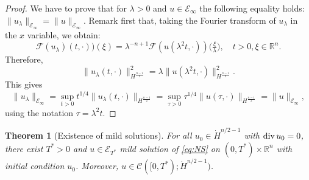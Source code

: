 \documentclass[a4paper, 12pt]{article}
\theoremstyle{plain}
\newtheorem{theorem}[proposition]{Theorem}
\theoremstyle{definition}
\theoremstyle{remark}
\numberwithin{equation}{section}
\begin{document}
\begin{proof}
We have to prove that for $\lambda>0$ and $u\in {\mathscr{E}}_\infty$ the following equality holds: 
$\|u_\lambda\|_{{\mathscr{E}}_\infty}=\|u\|_{{\mathscr{E}}_\infty}$.
Remark first that, taking the Fourier transform of $u_\lambda$ in the $x$ variable, we obtain:
\[
{\mathscr{F}}(u_\lambda)(t,\cdot))(\xi)=\lambda^{-n+1}{\mathscr{F}} (u(\lambda^2t, \cdot))\bigl(\tfrac{\xi}{\lambda}\bigr),
 \quad t>0, \xi\in{\mathds{R}}^n.
\]
Therefore, 
\[
\|u_\lambda(t,\cdot)\|_{H^{\frac{n-1}{2}}}^2 =\lambda \|u(\lambda^2t, \cdot)\|_{H^{\frac{n-1}{2}}}^2.
\]
This gives
\[
\|u_\lambda\|_{{\mathscr{E}}_\infty}=\sup_{t>0}t^{1/4}\|u_\lambda(t,\cdot)\|_{H^{\frac{n-1}{2}}}
=\sup_{\tau>0}\tau^{1/4}\|u(\tau,\cdot)\|_{H^{\frac{n-1}{2}}}=\|u\|_{{\mathscr{E}}_\infty},
\]
using the notation $\tau=\lambda^2t$.
\end{proof}

\begin{theorem}[Existence of mild solutions]
\label{thm:mildHs}
For all $u_0\in\dot H^{n/2-1}$ with ${\rm div}\,u_0=0$, there exist $T^*>0$ and 
$u\in{\mathscr{E}}_{T^*}$ mild solution of \eqref{eq:NS} on $(0,T^*)\times{\mathds{R}}^n$ 
with initial condition $u_0$. Moreover, $u\in{\mathscr{C}}([0,T^*);\dot H^{n/2-1})$.
\end{theorem}
\end{document}
